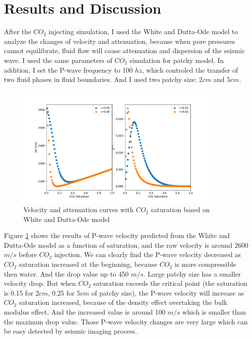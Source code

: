 \section{Results and Discussion}

After the $CO_2$ injecting simulation, I used the White and Dutta-Ode model \citep{lewandowski2009book} to analyze the
changes of velocity and attenuation, because when pore pressures cannot equilibrate, fluid flow will cause attenuation and dispersion of the seismic wave. 
I used the same parameters of  $CO_2$ simulation for patchy model.
In addition, I set the P-wave frequency to 100 $hz$, which controled the transfer of two
fluid phases in fluid boundaries.
And I used two patchy size: $2 cm$ and $5 cm$.

\begin{figure}[H]
    \centering
    \includegraphics[width=0.9\textwidth]{figures/project/V_curve1.pdf}
    \caption{Velocity and attenuation curves with $CO_2$  saturation based on White and Dutta-Ode model}
    \label{fig:V_curve1}
\end{figure}


Figure \ref{fig:V_curve1} shows the results of P-wave velocity predicted from the White and Dutta-Ode model
as a function of saturation, and the raw velocity is around 2600 $m/s$ before $CO_2$ injection.
We can clearly find the P-wave velocity decreased as $CO_2$ saturation increased at the beginning, because
$CO_2$ is more compressible then water. And the drop value up to 450 $m/s$.
Large patchy size has a smaller velocity drop.
But when $CO_2$ saturation exceeds the critical point (the saturation is 0.15 for $2 cm$, 0.25 for $5 cm$ of patchy size),
the P-wave velocity will increase as $CO_2$ saturation increased, 
because of the density effect overtaking the bulk modulus effect.
And the increased value is around 100 $m/s$ which is smaller than the maximun drop value.
Those P-wave velocity changes are very large which can be easy detected by seismic imaging process.

